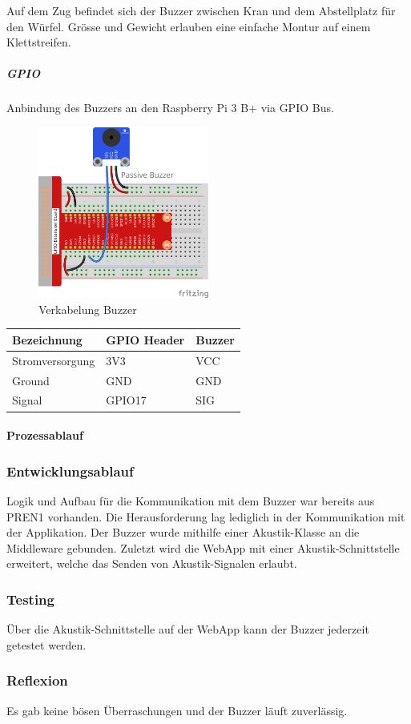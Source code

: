 \documentclass[../../main.tex]{subfiles}
\begin{document}
Auf dem Zug befindet sich der Buzzer zwischen Kran und dem Abstellplatz für den Würfel. Grösse und Gewicht erlauben eine einfache Montur auf einem Klettstreifen.

\subparagraph{GPIO}
Anbindung des Buzzers an den Raspberry Pi 3 B+ via GPIO Bus.

\begin{figure}[H] \centering
    \includegraphics[width=0.5\textwidth]{VerkabelungAkustik}
    \caption{Verkabelung Buzzer}
    \label{fig:Buzzer}
\end{figure}
\begin{table}[H]
    \begin{center}
    \begin{tabular}{lll}
    \hline
    Bezeichnung     & GPIO Header & Buzzer \\ \hline
    Stromversorgung & 3V3      & VCC    \\ \hline
    Ground          & GND      & GND    \\ \hline
    Signal          & GPIO17   & SIG    \\ \hline
    \end{tabular}
    \end{center}
\end{table}

\paragraph{Prozessablauf}

\subsubsection{Entwicklungsablauf}
Logik und Aufbau für die Kommunikation mit dem Buzzer war bereits aus PREN1 vorhanden. Die Herausforderung lag lediglich in der Kommunikation mit der Applikation. Der Buzzer wurde mithilfe einer Akustik-Klasse an die Middleware gebunden. Zuletzt wird die WebApp mit einer Akustik-Schnittstelle erweitert, welche das Senden von Akustik-Signalen erlaubt. 

\subsubsection{Testing}
Über die Akustik-Schnittstelle auf der WebApp kann der Buzzer jederzeit getestet werden.

\subsubsection{Reflexion}
Es gab keine bösen Überraschungen und der Buzzer läuft zuverlässig. 
\end{document}
